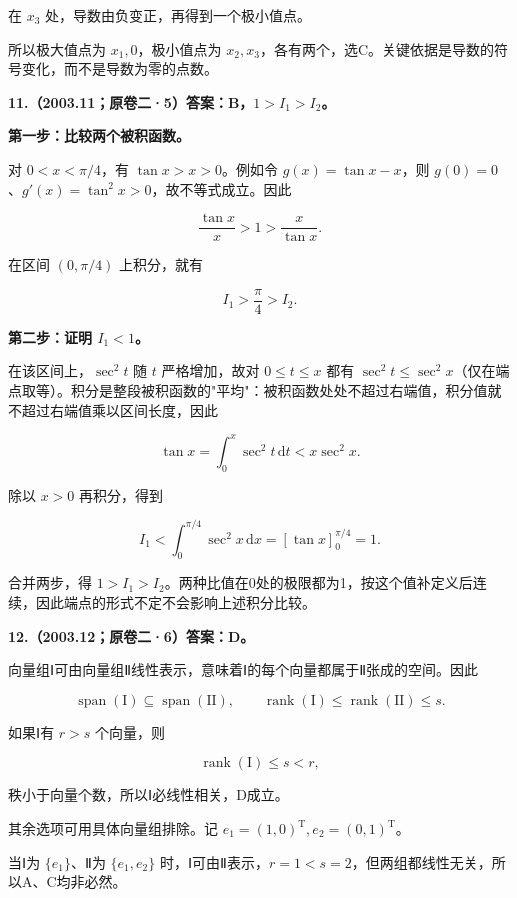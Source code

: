 \documentclass[UTF8,11pt,fontset=windows]{ctexart}
\begin{document}
在 $x_3$ 处，导数由负变正，再得到一个极小值点。

所以极大值点为 $x_1,0$，极小值点为 $x_2,x_3$，各有两个，选C。关键依据是导数的符号变化，而不是导数为零的点数。

\clearpage

\textbf{11.（2003.11；原卷二·5）答案：B，$1>I_1>I_2$。}

\textbf{第一步：比较两个被积函数。}

对 $0<x<\pi/4$，有 $\tan x>x>0$。例如令 $g(x)=\tan x-x$，则 $g(0)=0$、$g'(x)=\tan^2x>0$，故不等式成立。因此

$$
\frac{\tan x}{x}>1>\frac{x}{\tan x}.
$$

在区间 $(0,\pi/4)$ 上积分，就有

$$
I_1>\frac\pi4>I_2.
$$

\textbf{第二步：证明 $I_1<1$。}

在该区间上，$\sec^2t$ 随 $t$ 严格增加，故对 $0\le t\le x$ 都有 $\sec^2t\le\sec^2x$（仅在端点取等）。积分是整段被积函数的"平均"：被积函数处处不超过右端值，积分值就不超过右端值乘以区间长度，因此

$$
\tan x=\int_0^x\sec^2t\,\mathrm dt
<x\sec^2x.
$$

除以 $x>0$ 再积分，得到

$$
I_1<\int_0^{\pi/4}\sec^2x\,\mathrm dx
=[\tan x]_0^{\pi/4}=1.
$$

合并两步，得 $\boxed{1>I_1>I_2}$。两种比值在0处的极限都为1，按这个值补定义后连续，因此端点的形式不定不会影响上述积分比较。

\clearpage

\textbf{12.（2003.12；原卷二·6）答案：D。}

向量组Ⅰ可由向量组Ⅱ线性表示，意味着Ⅰ的每个向量都属于Ⅱ张成的空间。因此

$$
\operatorname{span}(\mathrm I)\subseteq\operatorname{span}(\mathrm {II}),
\qquad \operatorname{rank}(\mathrm I)\le\operatorname{rank}(\mathrm {II})\le s.
$$

如果Ⅰ有 $r>s$ 个向量，则

$$
\operatorname{rank}(\mathrm I)\le s<r,
$$

秩小于向量个数，所以Ⅰ必线性相关，D成立。

其余选项可用具体向量组排除。记 $e_1=(1,0)^{\mathrm T},e_2=(0,1)^{\mathrm T}$。

当Ⅰ为 $\{e_1\}$、Ⅱ为 $\{e_1,e_2\}$ 时，Ⅰ可由Ⅱ表示，$r=1<s=2$，但两组都线性无关，所以A、C均非必然。
\end{document}
